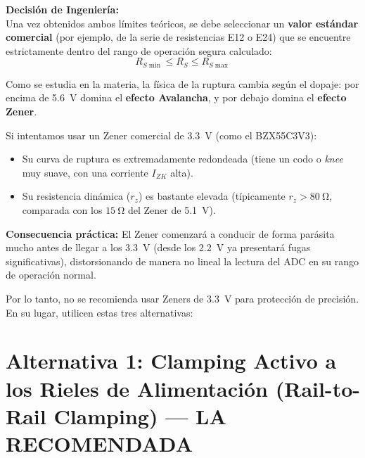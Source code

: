 \documentclass[11pt, a4paper]{article}
\begin{document}
\vspace{0.4cm}
\textbf{Decisión de Ingeniería:}\\
Una vez obtenidos ambos límites teóricos, se debe seleccionar un \textbf{valor estándar comercial} (por ejemplo, de la serie de resistencias E12 o E24) que se encuentre estrictamente dentro del rango de operación segura calculado:
\begin{equation}
    R_{S\min} \le R_S \le R_{S\max}
\end{equation}

\begin{aviso}
Como se estudia en la materia, la física de la ruptura cambia según el dopaje: por encima de \qty{5.6}{\volt} domina el \textbf{efecto Avalancha}, y por debajo domina el \textbf{efecto Zener}.

Si intentamos usar un Zener comercial de \qty{3.3}{\volt} (como el BZX55C3V3):
\begin{itemize}
    \item Su curva de ruptura es extremadamente redondeada (tiene un codo o \textit{knee} muy suave, con una corriente $I_{ZK}$ alta).
    \item Su resistencia dinámica ($r_z$) es bastante elevada (típicamente $r_z > \qty{80}{\ohm}$, comparada con los $\qty{15}{\ohm}$ del Zener de \qty{5.1}{\volt}).
\end{itemize}
\textbf{Consecuencia práctica:} El Zener comenzará a conducir de forma parásita mucho antes de llegar a los \qty{3.3}{\volt} (desde los \qty{2.2}{\volt} ya presentará fugas significativas), distorsionando de manera no lineal la lectura del ADC en su rango de operación normal.
\end{aviso}

Por lo tanto, no se recomienda usar Zeners de \qty{3.3}{\volt} para protección de precisión. En su lugar, utilicen estas tres alternativas:

\vspace{0.4cm}

\section{Alternativa 1: Clamping Activo a los Rieles de Alimentación (Rail-to-Rail Clamping) — LA RECOMENDADA}
\end{document}
